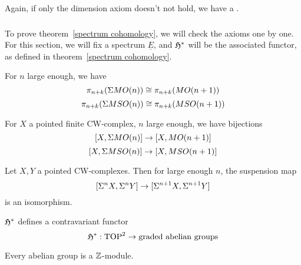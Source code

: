 \documentclass[a4paper,11pt]{article}
\begin{document}
Again, if only the dimension axiom doesn't not hold, we have a .

\subsubsection{}\label{cohomology}
To prove theorem\ \ref{spectrum cohomology}, we will check the axioms one by one. For this section, we will fix a spectrum \(\underline{E}\), and \(\mathfrak{H}^\ast\) will be the associated functor, as defined in theorem\ \ref{spectrum cohomology}.

\begin{theorem}
    For \(n\) large enough, we have
    \[\pi_{n+k}(\Sigma MO(n))\cong\pi_{n+k}(MO(n+1))\]
    \[\pi_{n+k}(\Sigma MSO(n))\cong\pi_{n+k}(MSO(n+1))\]
\end{theorem}

\begin{corollary}
    For \(X\) a pointed finite CW-complex, \(n\) large enough, we have bijections
    \[[X,\Sigma MO(n)]\to[X,MO(n+1)]\]
    \[[X,\Sigma MSO(n)]\to[X,MSO(n+1)]\]
\end{corollary}

\begin{theorem}\label{freudenthal}
    Let \(X,Y\) a pointed CW-complexes. Then for large enough \(n\), the suspension map
    \[[\Sigma^n X,\Sigma^n Y]\to[\Sigma^{n+1} X,\Sigma^{n+1}Y]\]
    is an isomorphism.
\end{theorem}

\begin{lemma}[Functoriality]\label{cofunctoriality}
    \(\mathfrak{H}^\ast\) defines a contravariant functor
    \[\mathfrak{H}^\ast:\mathrm{TOP}^2\to \text{graded abelian groups}\]
\end{lemma}

\begin{remark}
    Every abelian group is a \(\mathbb{Z}\)-module.
\end{remark}
\end{document}
